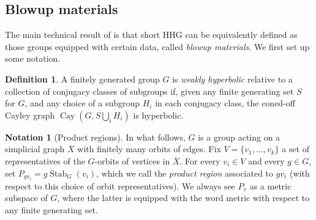\documentclass[svgnames]{amsart}
\theoremstyle{plain}
\theoremstyle{definition}
\newtheorem{defn}[thm]{Definition}
\newtheorem{notation}[thm]{Notation}
\newcommand{\Cay}[2]{\operatorname{Cay}\left(#1,#2\right)}
\newcommand{\ov}[1]{\overline{#1}}
\newcommand{\Stab}[2]{\operatorname{Stab}_{#1}(#2)}
\begin{document}
\subsection{Blowup materials}\label{subsec:squid}
The main technical result of \cite{Short_HHG:I} is that short HHG can be equivalently defined as those groups equipped with certain data, called \emph{blowup materials}. We first set up some notation.
\begin{defn}
    A finitely generated group $G$ is \emph{weakly hyperbolic} relative to a collection of conjugacy classes of subgroups if, given any finite generating set $S$ for $G$, and any choice of a subgroup $H_i$ in each conjugacy class, the coned-off Cayley graph $\Cay{G}{S\bigcup_i H_i}$ is hyperbolic.
\end{defn}
\begin{notation}[Product regions]\label{notation:pre_def_squid}
In what follows, $G$ is a group acting on a simplicial graph $\ov X$ with finitely many orbits of edges. Fix $V=\{v_1,\ldots, v_k\}$ a set of representatives of the $G$-orbits of vertices in $\ov{X}$. For every $v_i\in V$ and every $g\in G$, set $P_{gv_i}=g\Stab{G}{v_i}$, which we call the \emph{product region} associated to $gv_i$ (with respect to this choice of orbit representatives). We always see $P_v$ as a metric subspace of $G$, where the latter is equipped with the word metric with respect to any finite generating set. 
\end{notation}
\end{document}
